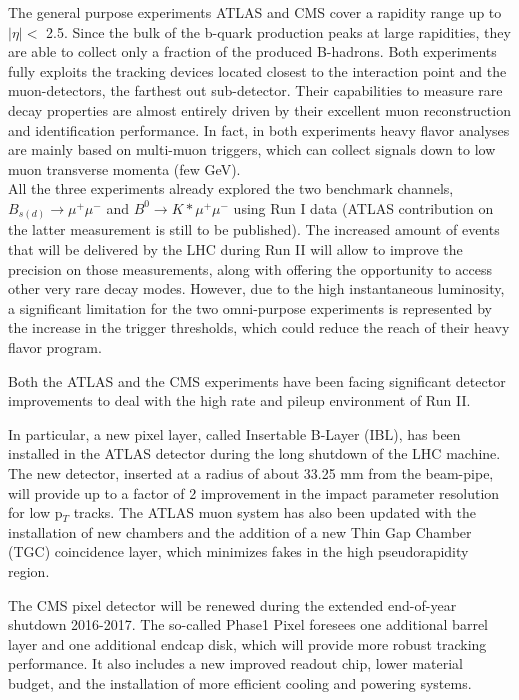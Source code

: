 The general purpose experiments ATLAS and CMS cover a rapidity range up to $|\eta | <$ 2.5.
Since the bulk of the b-quark production peaks at large rapidities, they are able to collect only a fraction of the produced B-hadrons.
Both experiments fully exploits the tracking devices located closest to the interaction point and the muon-detectors, the farthest out sub-detector. 
Their capabilities to measure rare decay properties are almost entirely driven by their excellent muon reconstruction and identification performance.
In fact, in both experiments heavy flavor analyses are mainly based on multi-muon triggers, which can collect signals down to low muon transverse momenta (few GeV). \\

All the three experiments already explored the two benchmark channels, $B_{s(d)} \to \mu^+\mu^-$ and $B^0 \to K*\mu^+\mu^-$ using Run I data (ATLAS contribution on the latter measurement is still to be published).
The increased amount of events that will be delivered by the LHC during Run II will allow to improve the precision on those measurements, along with offering the opportunity to access other very rare decay modes.
However, due to the high instantaneous luminosity, a significant limitation for the two omni-purpose experiments is represented by the increase in the trigger thresholds, which could reduce the reach of their heavy flavor program.

Both the ATLAS and the CMS experiments have been facing significant detector improvements to deal with the high rate and pileup environment of Run II. 

In particular, a new pixel layer, called Insertable B-Layer (IBL), has been installed in the ATLAS detector during the long shutdown of the LHC machine. 
The new detector, inserted at a radius of about 33.25 mm from the beam-pipe, will provide up to a factor of 2 improvement in the impact parameter resolution for low p$_T$ tracks.
The ATLAS muon system has also been updated with the installation of new chambers and the addition of a new Thin Gap Chamber (TGC) coincidence layer, which minimizes fakes in the high pseudorapidity region.

The CMS pixel detector will be renewed during the extended end-of-year shutdown 2016-2017. 
The so-called Phase1 Pixel foresees one additional barrel layer and one additional endcap disk, which will provide more robust tracking performance. 
It also includes a new improved readout chip, lower material budget, and the installation of more efficient cooling and powering systems.\\


